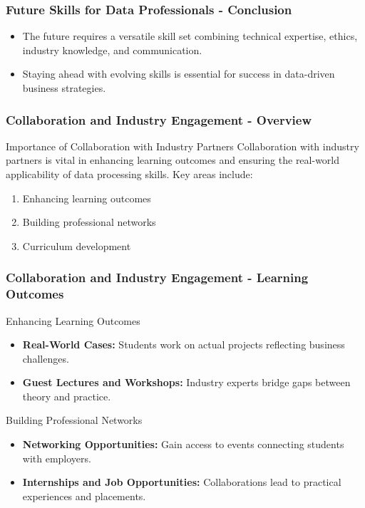 \documentclass{beamer}
\begin{document}
\begin{frame}[fragile]
    \frametitle{Future Skills for Data Professionals - Conclusion}
    \begin{itemize}
        \item The future requires a versatile skill set combining technical expertise, ethics, industry knowledge, and communication.
        \item Staying ahead with evolving skills is essential for success in data-driven business strategies.
    \end{itemize}
\end{frame}

\begin{frame}[fragile]
    \frametitle{Collaboration and Industry Engagement - Overview}
    \begin{block}{Importance of Collaboration with Industry Partners}
        Collaboration with industry partners is vital in enhancing learning outcomes and ensuring the real-world applicability of data processing skills. Key areas include:
        \begin{enumerate}
            \item Enhancing learning outcomes
            \item Building professional networks
            \item Curriculum development
        \end{enumerate}
    \end{block}
\end{frame}

\begin{frame}[fragile]
    \frametitle{Collaboration and Industry Engagement - Learning Outcomes}
    \begin{block}{Enhancing Learning Outcomes}
        \begin{itemize}
            \item \textbf{Real-World Cases:} Students work on actual projects reflecting business challenges.
            \item \textbf{Guest Lectures and Workshops:} Industry experts bridge gaps between theory and practice.
        \end{itemize}
    \end{block}
    
    \begin{block}{Building Professional Networks}
        \begin{itemize}
            \item \textbf{Networking Opportunities:} Gain access to events connecting students with employers.
            \item \textbf{Internships and Job Opportunities:} Collaborations lead to practical experiences and placements.
        \end{itemize}
    \end{block}
\end{frame}
\end{document}
